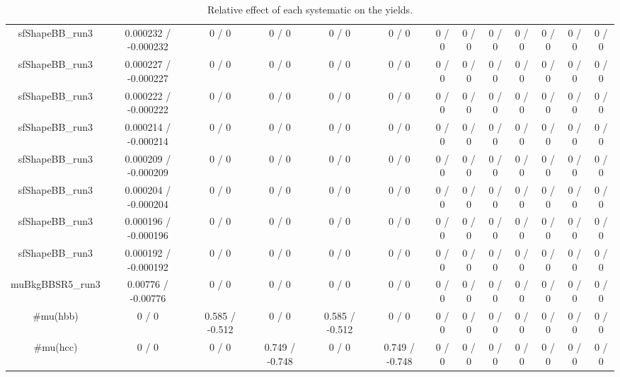 \documentclass[10pt]{article}
\begin{document}
\begin{table}[htbp]
\begin{center}
\begin{tabular}{|c|c|c|c|c|c|c|c|c|c|c|c|c|}
  sfShapeBB_run3 & 0.000232 / -0.000232 & 0 / 0 & 0 / 0 & 0 / 0 & 0 / 0 & 0 / 0 & 0 / 0 & 0 / 0 & 0 / 0 & 0 / 0 & 0 / 0 & 0 / 0 \\ 
  sfShapeBB_run3 & 0.000227 / -0.000227 & 0 / 0 & 0 / 0 & 0 / 0 & 0 / 0 & 0 / 0 & 0 / 0 & 0 / 0 & 0 / 0 & 0 / 0 & 0 / 0 & 0 / 0 \\ 
  sfShapeBB_run3 & 0.000222 / -0.000222 & 0 / 0 & 0 / 0 & 0 / 0 & 0 / 0 & 0 / 0 & 0 / 0 & 0 / 0 & 0 / 0 & 0 / 0 & 0 / 0 & 0 / 0 \\ 
  sfShapeBB_run3 & 0.000214 / -0.000214 & 0 / 0 & 0 / 0 & 0 / 0 & 0 / 0 & 0 / 0 & 0 / 0 & 0 / 0 & 0 / 0 & 0 / 0 & 0 / 0 & 0 / 0 \\ 
  sfShapeBB_run3 & 0.000209 / -0.000209 & 0 / 0 & 0 / 0 & 0 / 0 & 0 / 0 & 0 / 0 & 0 / 0 & 0 / 0 & 0 / 0 & 0 / 0 & 0 / 0 & 0 / 0 \\ 
  sfShapeBB_run3 & 0.000204 / -0.000204 & 0 / 0 & 0 / 0 & 0 / 0 & 0 / 0 & 0 / 0 & 0 / 0 & 0 / 0 & 0 / 0 & 0 / 0 & 0 / 0 & 0 / 0 \\ 
  sfShapeBB_run3 & 0.000196 / -0.000196 & 0 / 0 & 0 / 0 & 0 / 0 & 0 / 0 & 0 / 0 & 0 / 0 & 0 / 0 & 0 / 0 & 0 / 0 & 0 / 0 & 0 / 0 \\ 
  sfShapeBB_run3 & 0.000192 / -0.000192 & 0 / 0 & 0 / 0 & 0 / 0 & 0 / 0 & 0 / 0 & 0 / 0 & 0 / 0 & 0 / 0 & 0 / 0 & 0 / 0 & 0 / 0 \\ 
  muBkgBBSR5_run3 & 0.00776 / -0.00776 & 0 / 0 & 0 / 0 & 0 / 0 & 0 / 0 & 0 / 0 & 0 / 0 & 0 / 0 & 0 / 0 & 0 / 0 & 0 / 0 & 0 / 0 \\ 
  #mu(hbb) & 0 / 0 & 0.585 / -0.512 & 0 / 0 & 0.585 / -0.512 & 0 / 0 & 0 / 0 & 0 / 0 & 0 / 0 & 0 / 0 & 0 / 0 & 0 / 0 & 0 / 0 \\ 
  #mu(hcc) & 0 / 0 & 0 / 0 & 0.749 / -0.748 & 0 / 0 & 0.749 / -0.748 & 0 / 0 & 0 / 0 & 0 / 0 & 0 / 0 & 0 / 0 & 0 / 0 & 0 / 0 \\ 
\hline 
\end{tabular} 
\caption{Relative effect of each systematic on the yields.} 
\end{center} 
\end{table} 
\end{document}
